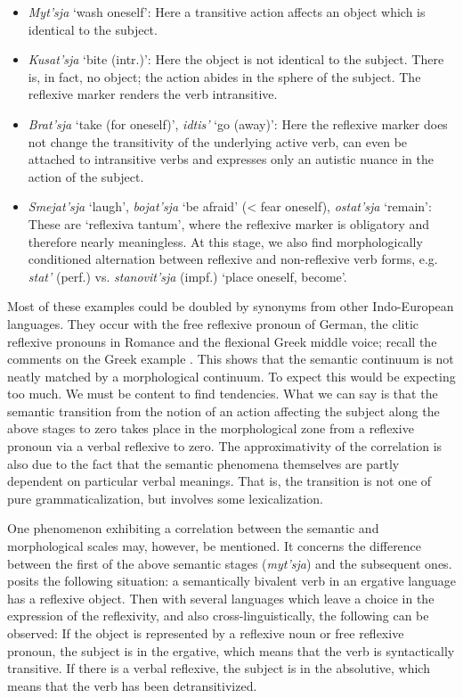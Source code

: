 \begin{itemize}

\item[] \textit{Myt'sja} ‘wash oneself’: Here a transitive action affects an object which is identical to the subject.

\item[] \textit{Kusat'sja} ‘bite (intr.)’: Here the object is not identical to the subject. There is, in fact, no object; the action abides in the sphere of the subject. The reflexive marker renders the verb intransitive.

\item[] \textit{Brat'sja} ‘take (for oneself)’, \textit{idtis'} ‘go (away)’: Here the reflexive marker does not change the transitivity of the underlying active verb, can even be attached to intransitive verbs and expresses only an autistic nuance in the action of the subject.

\item[] \textit{Smejat'sja} ‘laugh’, \textit{bojat'sja} ‘be afraid’ ({\textless} fear oneself), \textit{ostat'sja} ‘remain’: These are ‘reflexiva tantum’, where the reflexive marker is obligatory and therefore nearly meaningless. At this stage, we also find morphologically conditioned alternation between reflexive and non-reflexive verb forms, e.g. \textit{stat'} (perf.) vs. \textit{stanovit'sja} (impf.) ‘place oneself, become’.

\end{itemize}

Most of these examples could be doubled by synonyms from other Indo-European languages. They occur with the free reflexive pronoun of German, the clitic reflexive pronouns in Romance and the flexional Greek middle voice; recall the comments on the Greek example . This shows that the semantic continuum is not neatly matched by a morphological continuum. To expect this would be expecting too much. We must be content to find tendencies. What we can say is that the semantic transition from the notion of an action affecting the subject along the above stages to zero takes place in the morphological zone from a reflexive pronoun via a verbal reflexive to zero. The approximativity of the correlation is also due to the fact that the semantic phenomena themselves are partly dependent on particular verbal meanings. That is, the transition is not one of pure grammaticalization, but involves some lexicalization.

One phenomenon exhibiting a correlation between the semantic and morphological scales may, however, be mentioned. It concerns the difference between the first of the above semantic stages (\textit{myt'sja}) and the subsequent ones. \citet[646f]{Edmondson1978} posits the following situation: a semantically bivalent verb in an ergative language has a reflexive object. Then with several languages which leave a choice in the expression of the reflexivity, and also cross-linguistically, the following can be observed: If the object is represented by a reflexive noun or free reflexive pronoun, the subject is in the ergative, which means that the verb is syntactically transitive. If there is a verbal reflexive, the subject is in the absolutive, which means that the verb has been detransitivized.

